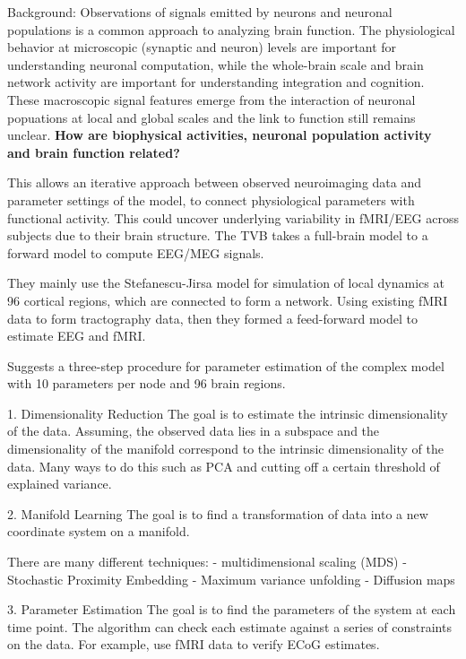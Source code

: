 \documentclass{article}
\begin{document}
Background: Observations of signals emitted by neurons and neuronal populations is a common approach to analyzing brain function. The physiological behavior at microscopic (synaptic and neuron) levels are important for understanding neuronal computation, while the whole-brain scale and brain network activity are important for understanding integration and cognition. These macroscopic signal features emerge from the interaction of neuronal popuations at local and global scales and the link to function still remains unclear. \textbf{How are biophysical activities, neuronal population activity and brain function related?} 

This allows an iterative approach between observed neuroimaging data and parameter settings of the model, to connect physiological parameters with functional activity. This could uncover underlying variability in fMRI/EEG across subjects due to their brain structure. The TVB takes a full-brain model to a forward model to compute EEG/MEG signals.

They mainly use the Stefanescu-Jirsa model for simulation of local dynamics at 96 cortical regions, which are connected to form a network. Using existing fMRI data to form tractography data, then they formed a feed-forward model to estimate EEG and fMRI.

Suggests a three-step procedure for parameter estimation of the complex model with 10 parameters per node and 96 brain regions. 

1. Dimensionality Reduction
The goal is to estimate the intrinsic dimensionality of the data. Assuming, the observed data lies in a subspace and the dimensionality of the manifold correspond to the intrinsic dimensionality of the data. Many ways to do this such as PCA and cutting off a certain threshold of explained variance.

2. Manifold Learning
The goal is to find a transformation of data into a new coordinate system on a manifold. 

There are many different techniques:
- multidimensional scaling (MDS)
- Stochastic Proximity Embedding
- Maximum variance unfolding 
- Diffusion maps

3. Parameter Estimation
The goal is to find the parameters of the system at each time point. The algorithm can check each estimate against a series of constraints on the data. For example, use fMRI data to verify ECoG estimates.



\newpage
\small
{
  
  
}
\end{document}

